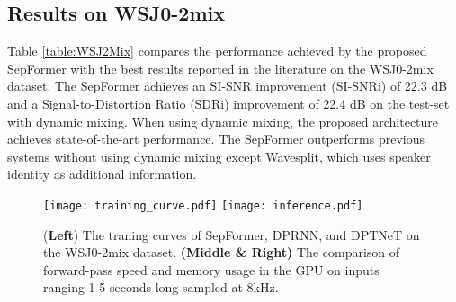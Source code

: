 \documentclass{article}
\begin{document}
  

\subsection{Results on WSJ0-2mix}
Table \ref{table:WSJ2Mix} compares the performance achieved by the proposed SepFormer with the best results reported in the literature on the WSJ0-2mix dataset. The SepFormer achieves an SI-SNR improvement (SI-SNRi) of 22.3 dB and a Signal-to-Distortion Ratio \cite{vincent2006performance} (SDRi) improvement of 22.4 dB on the test-set with dynamic mixing. When using  dynamic mixing, the proposed architecture achieves state-of-the-art performance. The SepFormer outperforms previous systems without using dynamic mixing except Wavesplit, which uses speaker identity as additional information. 


\begin{figure*}[t!]
    \centering
    \texttt{[image: training\_curve.pdf]}
    \texttt{[image: inference.pdf]}
    \vspace{-0.2cm}
    \caption{(\textbf{Left}) The traning curves of SepFormer, DPRNN, and DPTNeT on the WSJ0-2mix dataset. \textbf{(Middle \& Right)} The comparison of forward-pass speed and memory usage in the GPU on inputs ranging 1-5 seconds long sampled at 8kHz.}
    \label{fig:forwardpass}
    \vspace{-0.2cm}
\end{figure*}


\vspace{-0.2cm}
\begin{table}[t!]
    \caption{Ablation of the SepFormer on WSJ0-2Mix (validation set).}
    \vspace{0.1cm}
     \label{tab:ablation}
\end{table}
\end{document}
